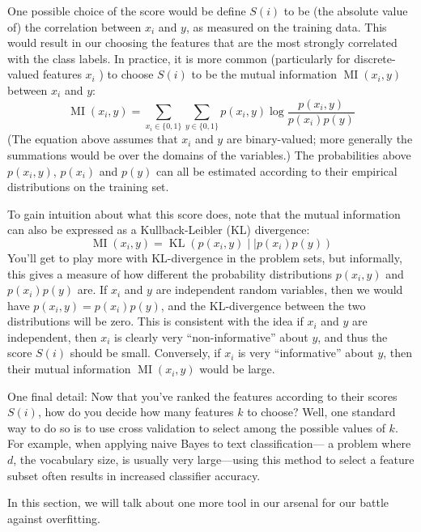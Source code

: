 One possible choice of the score would be define $S(i)$ to be (the absolute
value of) the correlation between $x_i$ and $y$, as measured on the training data.
This would result in our choosing the features that are the most strongly
correlated with the class labels. In practice, it is more common (particularly
for discrete-valued features $x_i$ ) to choose $S(i)$ to be the mutual information
$\operatorname{MI}(x_i ,y)$ between $x_i$ and $y$:
\begin{equation}
    \operatorname{MI}(x_i ,y) = \sum_{x_i \in \{0,1\}} \sum_{y \in \{0,1\}} p(x_i ,y)\log \frac{p(x_i ,y)}{p(x_i )p(y)}
\end{equation}
(The equation above assumes that $x_i$ and $y$ are binary-valued; more generally
the summations would be over the domains of the variables.) The
probabilities above $p(x_i ,y)$, $p(x_i )$ and $p(y)$ can all be estimated according to their
empirical distributions on the training set.

To gain intuition about what this score does, note that the mutual
information can also be expressed as a Kullback-Leibler (KL) divergence:
\begin{equation}
    \operatorname{MI}(x_i ,y) = \operatorname{KL}(p(x_i,y) \mid\mid p(x_i)p(y))
\end{equation}
You'll get to play more with KL-divergence in the problem sets, but
informally, this gives a measure of how different the probability distributions
$p(x_i ,y)$ and $p(x_i )p(y)$ are. If $x_i$ and $y$ are independent random variables,
then we would have $p(x_i ,y) = p(x_i )p(y)$, and the KL-divergence between the
two distributions will be zero. This is consistent with the idea if $x_i$ and $y$ are
independent, then $x_i$ is clearly very ``non-informative'' about $y$, and thus the
score $S(i)$ should be small. Conversely, if $x_i$ is very ``informative'' about $y$,
then their mutual information $\operatorname{MI}(x_i ,y)$ would be large.

One final detail: Now that you've ranked the features according to their
scores $S(i)$, how do you decide how many features $k$ to choose? Well, one
standard way to do so is to use cross validation to select among the possible
values of $k$. For example, when applying naive Bayes to text classification---
a problem where $d$, the vocabulary size, is usually very large---using this
method to select a feature subset often results in increased classifier accuracy.


\vspace{1cm}
In this section, we will talk about one more tool in our arsenal for our battle
against overfitting.

